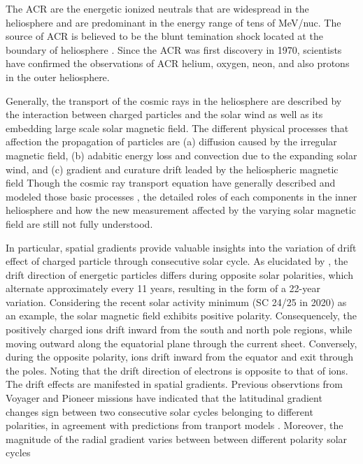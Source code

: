The \ac{ACR} are the energetic ionized neutrals that are widespread in the heliosphere and are predominant in the energy range of tens of MeV/nuc. The source of \ac{ACR} is believed to be the blunt temination shock located at the boundary of heliosphere \citep{McComas2006GeoRL}. Since the \ac{ACR} was first discovery in 1970, scientists have confirmed the observations of \ac{ACR} helium, oxygen, neon, and also protons in the outer heliosphere. \citep{Garcia1973ICRC,Hoverstadt1973PhRvL,McDonald1974ApJ,Potgieter2013LRSP}

Generally, the transport of the cosmic rays in the heliosphere are described by the interaction between charged particles and the solar wind as well as its embedding large scale solar magnetic field. The different physical processes that affection the propagation of particles are (a) diffusion caused by the irregular magnetic field, (b) adabitic energy loss and convection due to the expanding solar wind, and (c) gradient and curature drift leaded by the heliospheric magnetic field
Though the cosmic ray transport equation have generally described and modeled those basic processes \citep{Parker1965Pss,Jokipii1977ApJ,Jokipii1981ApJ,McDonald2001ICRC}, the detailed roles of each components in the inner heliosphere and how the new measurement affected by the varying solar magnetic field are still not fully understood. \citep{Rankin2021ApJ}

In particular, spatial gradients provide valuable insights into the variation of drift effect of charged particle through consecutive solar cycle. As elucidated by \citet{Jokipii1977ApJ, Jokipii1979ApJ, Potgieter2013LRSP}, the drift direction of energetic particles differs during opposite solar polarities, which alternate approximately every 11 years, resulting in the form of a 22-year variation. Considering the recent solar activity minimum (\ac{SC} 24/25 in 2020) as an example, the solar magnetic field exhibits positive polarity. Consequencely, the positively charged ions drift inward from the south and north pole regions, while moving outward along the equatorial plane through the current sheet. Conversely, during the opposite polarity, ions drift inward from the equator and exit through the poles. Noting that the drift direction of electrons is opposite to that of ions. The drift effects are manifested in spatial gradients. Previous observtions from Voyager and Pioneer missions have indicated that the latitudinal gradient changes sign between two consecutive solar cycles belonging to different polarities, in agreement with predictions from tranport models \citep{Mckibben1979ApJ, Cummings1987GeoRL, Christon1986JGR}. Moreover, the magnitude of the radial gradient varies between between different polarity solar cycles \citep{Rankin2021ApJ,Rankin2022ApJ,Giacalone2022SSRv,Webber1981JGR,Marsden1999AdSpR}

